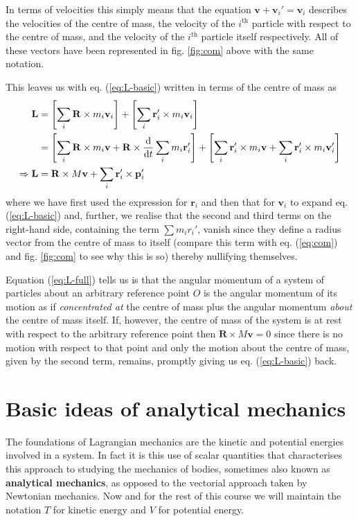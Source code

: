 \documentclass[english,seminar,headertitle]{lecture}
\begin{document}
In terms of velocities this simply means that the equation $\mathbf{v} + \mathbf{v}_i' = \mathbf{v}_i$ describes the velocities of the centre of mass, the velocity of the $i^\textrm{th}$ particle with respect to the centre of mass, and the velocity of the $i^\textrm{th}$ particle itself respectively. All of these vectors have been represented in fig. \ref{fig:com} above with the same notation.

This leaves us with eq. (\ref{eq:L-basic}) written in terms of the centre of mass as
\begin{align}
	\mathbf{L} &= \left[ \sum_i \mathbf{R} \times m_i\mathbf{v}_i \right] + \left[ \sum_i \mathbf{r}_i' \times m_i\mathbf{v}_i \right]\nonumber \\
	&= \left[ \sum_i \mathbf{R} \times m_i\mathbf{v} + \mathbf{R} \times {\textrm{d}\over\textrm{d}t} \sum_i m_i\mathbf{r}_i' \right] + \left[ \sum_i \mathbf{r}_i' \times m_i\mathbf{v} + \sum_i \mathbf{r}_i' \times m_i\mathbf{v}_i' \right] \nonumber \\
\Rightarrow \mathbf{L} &= \mathbf{R} \times M \mathbf{v} + \sum_i \mathbf{r}_i' \times \mathbf{p}_i' \label{eq:L-full}
\end{align}
where we have first used the expression for $\mathbf{r}_i$ and then that for $\mathbf{v}_i$ to expand eq. (\ref{eq:L-basic}) and, further, we realise that the second and third terms on the right-hand side, containing the term $\sum m_i r_i'$, vanish since they define a radius vector from the centre of mass to itself (compare this term with eq. (\ref{eq:com}) and fig. \ref{fig:com} to see why this is so) thereby nullifying themselves.

Equation (\ref{eq:L-full}) tells us is that the angular momentum of a system of particles about an arbitrary reference point $O$ is the angular momentum of its motion as if \textit{concentrated at} the centre of mass plus the angular momentum \textit{about} the centre of mass itself. If, however, the centre of mass of the system is at rest with respect to the arbitrary reference point then $\mathbf{R} \times M\mathbf{v} = 0$ since there is no motion with respect to that point and only the motion about the centre of mass, given by the second term, remains, promptly giving us eq. (\ref{eq:L-basic}) back.
%
\section{Basic ideas of analytical mechanics}
%
The foundations of Lagrangian mechanics are the kinetic and potential energies involved in a system. In fact it is this use of scalar quantities that characterises this approach to studying the mechanics of bodies, sometimes also known as \textbf{analytical mechanics}, as opposed to the vectorial approach taken by Newtonian mechanics. Now and for the rest of this course we will maintain the notation $T$ for kinetic energy and $V$ for potential energy.
\end{document}
